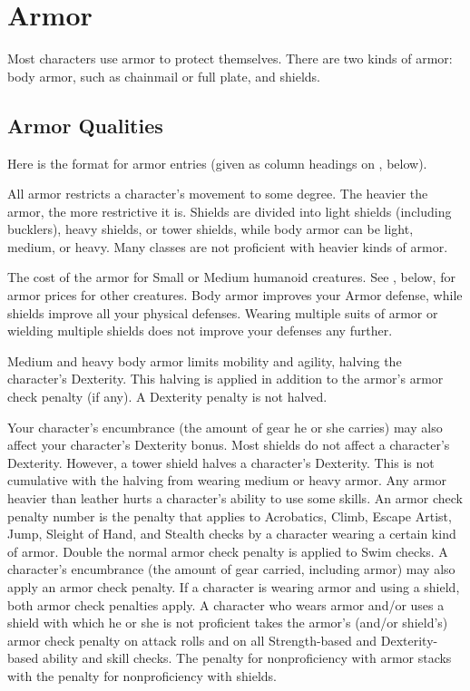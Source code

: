 \section{Armor}

Most characters use armor to protect themselves. There are two kinds of armor: body armor, such as chainmail or full plate, and shields.

\subsection{Armor Qualities}
\par Here is the format for armor entries (given as column headings on , below).

 All armor restricts a character's movement to some degree. The heavier the armor, the more restrictive it is. Shields are divided into light shields (including bucklers), heavy shields, or tower shields, while body armor can be light, medium, or heavy. Many classes are not proficient with heavier kinds of armor.

 The cost of the armor for Small or Medium humanoid
creatures. See , below, for armor prices for other creatures.
 Body armor improves your Armor defense, while shields improve all your physical defenses. Wearing multiple suits of armor or wielding multiple shields does not improve your defenses any further.

 Medium and heavy body armor limits mobility and agility, halving the character's Dexterity. This halving is applied in addition to the armor's armor check penalty (if any). A Dexterity penalty is not halved.

Your character's encumbrance (the amount of gear he or she carries) may also affect your character's Dexterity bonus.
 Most shields do not affect a character's Dexterity. However, a tower shield halves a character's Dexterity. This is not cumulative with the halving from wearing medium or heavy armor.
 Any armor heavier than leather hurts a character's ability to use some skills. An armor check penalty number is the penalty that applies to Acrobatics, Climb, Escape Artist, Jump, Sleight of Hand, and Stealth checks by a character wearing a certain kind of armor. Double the normal armor check penalty is applied to Swim checks. A character's encumbrance (the amount of gear carried, including armor) may also apply an armor check penalty.
 If a character is wearing armor and using a shield, both armor check penalties apply.
 A character who wears armor and/or uses a shield with which he or she is not proficient takes the armor's (and/or shield's) armor check penalty on attack rolls and on all Strength-based and Dexterity-based ability and skill checks. The penalty for nonproficiency with armor stacks with the penalty for nonproficiency with shields.

